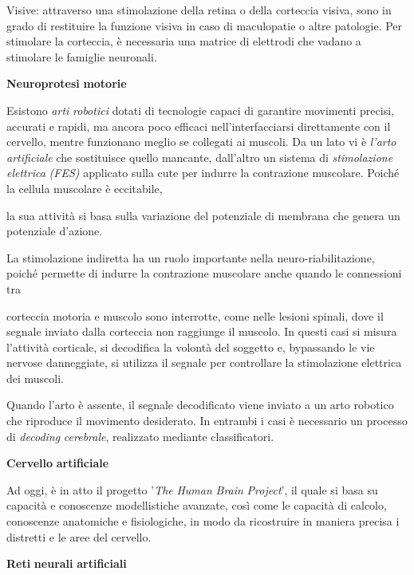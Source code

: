 \documentclass[12pt,a4paper]{book}
\begin{document}
Visive: attraverso una stimolazione della retina o della corteccia visiva, sono in grado di restituire la funzione visiva in caso di maculopatie o altre patologie. Per stimolare la corteccia, è necessaria una matrice di elettrodi che vadano a stimolare le famiglie neuronali.

\textbf{Neuroprotesi}\textbf{ }\textbf{motorie}

Esistono \textit{arti}\textit{ }\textit{robotici}\textit{ }dotati di tecnologie capaci di garantire movimenti precisi, accurati e rapidi, ma ancora poco efficaci nell'interfacciarsi direttamente con il cervello, mentre funzionano meglio se collegati ai muscoli. Da un lato vi è \textit{l'arto}\textit{ }\textit{artificiale}\textit{ }che sostituisce quello mancante, dall'altro un sistema di \textit{stimolazione}\textit{ }\textit{elettrica}\textit{ }\textit{(FES)}\textit{ }applicato sulla cute per indurre la contrazione muscolare. Poiché la cellula muscolare è eccitabile,

la sua attività si basa sulla variazione del potenziale di membrana che genera un potenziale d'azione.

La stimolazione indiretta ha un ruolo importante nella neuro-riabilitazione, poiché permette di indurre la contrazione muscolare anche quando le connessioni tra

corteccia motoria e muscolo sono interrotte, come nelle lesioni spinali, dove il segnale inviato dalla corteccia non raggiunge il muscolo. In questi casi si misura l'attività corticale, si decodifica la volontà del soggetto e, bypassando le vie nervose danneggiate, si utilizza il segnale per controllare la stimolazione elettrica dei muscoli.

Quando l'arto è assente, il segnale decodificato viene inviato a un arto robotico che riproduce il movimento desiderato. In entrambi i casi è necessario un processo di \textit{decoding}\textit{ }\textit{cerebrale}, realizzato mediante classificatori.

\textbf{Cervello}\textbf{ }\textbf{artificiale}

Ad oggi, è in atto il progetto '\textit{The}\textit{ }\textit{Human}\textit{ }\textit{Brain}\textit{ }\textit{Project}', il quale si basa su capacità e conoscenze modellistiche avanzate, così come le capacità di calcolo, conoscenze anatomiche e fisiologiche, in modo da ricostruire in maniera precisa i distretti e le aree del cervello.

\textbf{Reti}\textbf{ }\textbf{neurali}\textbf{ }\textbf{artificiali}
\end{document}
